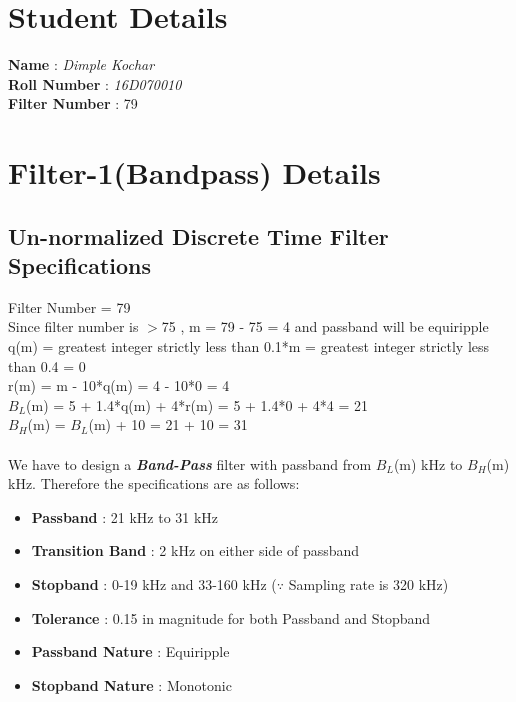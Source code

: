 \documentclass[12pt]{article}
\begin{document}

\tableofcontents
\pagebreak


\section{Student Details}
\textbf{Name } \hspace{2 cm}: \textit{Dimple Kochar}\\
\textbf{Roll Number } \hspace{0.5 cm}: \textit{16\textsc{D}070010}\\
\textbf{Filter Number }\hspace{0.2 cm}      : \textsc{79}

\vspace{0.5 cm}
\section{Filter-1(Bandpass) Details}
\subsection{Un-normalized Discrete Time Filter Specifications}
Filter Number = 79
\\Since filter number is $>$75 , m = 79 - 75 = 4 and passband will be equiripple\\
q(m) = greatest integer strictly less than 0.1*m = greatest integer strictly less than 0.4 = 0\\
r(m) = m - 10*q(m) = 4 - 10*0 = 4\\
$B_{L}$(m) = 5 + 1.4*q(m) + 4*r(m) = 5 + 1.4*0 + 4*4 = 21\\
$B_{H}$(m) = $B_{L}$(m) + 10 = 21 + 10 = 31\\ 
\\We have to design a \textbf{\textit{Band-Pass}} filter with passband from $B_{L}$(m) kHz to $B_{H}$(m) kHz. Therefore the specifications are as follows: \\
\begin{itemize}
\item \textbf{Passband} : 21 kHz to 31 kHz
\item \textbf{Transition Band} : 2 kHz on either side of passband
\item \textbf{Stopband} : 0-19 kHz and 33-160 kHz\hspace{1.5 cm} ($\because$ Sampling rate is 320 kHz)
\item \textbf{Tolerance} : 0.15 in magnitude for both Passband and Stopband
\item \textbf{Passband Nature} : Equiripple
\item \textbf{Stopband Nature} : Monotonic
\end{itemize}
\end{document}

